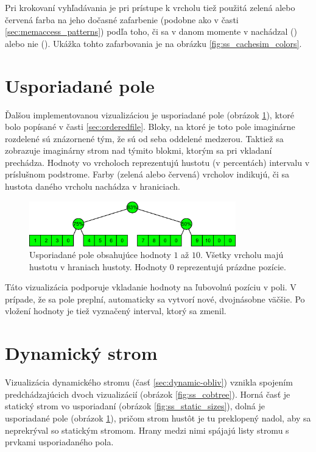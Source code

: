 Pri krokovaní vyhľadávania je pri prístupe k vrcholu tiež použitá zelená alebo červená farba na jeho dočasné zafarbenie (podobne ako v časti \ref{sec:memaccess_patterns}) podľa toho, či sa v danom momente v \cache nachádzal (\hit) alebo nie (\miss). Ukážka tohto zafarbovania je na obrázku \ref{fig:ss_cachesim_colors}.

\section{Usporiadané pole}
Ďalšou implementovanou vizualizáciou je usporiadané pole (obrázok \ref{fig:ss_of_overview}), ktoré bolo popísané v časti \ref{sec:orderedfile}. Bloky, na ktoré je toto pole imaginárne rozdelené sú znázornené tým, že sú od seba oddelené medzerou. Taktiež sa zobrazuje imaginárny strom nad týmito blokmi, ktorým sa pri vkladaní prechádza. Hodnoty vo vrcholoch reprezentujú hustotu (v percentách) intervalu v príslušnom podstrome. Farby (zelená alebo červená) vrcholov indikujú, či sa hustota daného vrcholu nachádza v hraniciach.

\begin{figure}
    \centering
    \includegraphics[width=0.8\textwidth]{figures/screenshots/of_overview_3.pdf}
    \caption[Usporiadané pole]{Usporiadané pole obsahujúce hodnoty $1$ až $10$. Všetky vrcholu majú hustotu v hraniach hustoty. Hodnoty $0$ reprezentujú prázdne pozície.}
    \label{fig:ss_of_overview}
\end{figure}

Táto vizualizácia podporuje vkladanie hodnoty na ľubovolnú pozíciu v poli. V prípade, že sa pole preplní, automaticky sa vytvorí nové, dvojnásobne väčšie. Po vložení hodnoty je tiež vyznačený interval, ktorý sa zmenil.

\section{Dynamický strom}
Vizualizácia dynamického stromu (časť \ref{sec:dynamic-obliv}) vznikla spojením predchádzajúcich dvoch vizualizácií (obrázok \ref{fig:ss_cobtree}). Horná časť je statický strom vo \vEB usporiadaní (obrázok \ref{fig:ss_static_sizes}), dolná je usporiadané pole (obrázok \ref{fig:ss_of_overview}), pričom strom hustôt je tu preklopený nadol, aby sa neprekrýval so statickým stromom. Hrany medzi nimi spájajú listy stromu s prvkami usporiadaného pola. 

